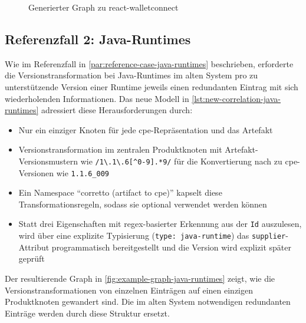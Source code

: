 \begin{figure}[htbp]
    \centering
    \makebox[\textwidth]{}
    \caption{Generierter Graph zu react-walletconnect}
    \label{fig:example-graph-walletconnect}
\end{figure}

\subsection{Referenzfall 2: Java-Runtimes}\label{subsec:example-java-runtimes}

Wie im Referenzfall in \autoref{par:reference-case-java-runtimes} beschrieben, erforderte die Versionstransformation bei Java-Runtimes im alten System pro zu unterstützende Version einer Runtime jeweils einen redundanten Eintrag mit sich wiederholenden Informationen.
Das neue Modell in \autoref{lst:new-correlation-java-runtimes} adressiert diese Herausforderungen durch:

\begin{itemize}
    \itemsep0em
    \item Nur ein einziger Knoten für jede \acrshort{cpe}-Repräsentation und das Artefakt
    \item Versionstransformation im zentralen Produktknoten mit Artefakt-Versionsmustern wie \verb|/1\.1\.6[^0-9].*9/| für die Konvertierung nach zu \acrshort{cpe}-Versionen wie \texttt{1.1.6\_009}
    \item Ein Namespace \enquote{corretto (artifact to cpe)} kapselt diese Transformationsregeln, sodass sie optional verwendet werden können
    \item Statt drei Eigenschaften mit regex-basierter Erkennung aus der \texttt{Id} auszulesen, wird über eine explizite Typisierung (\texttt{type: java-runtime}) das \texttt{supplier}-Attribut programmatisch bereitgestellt und die Version wird explizit später geprüft
\end{itemize}

Der resultierende Graph in \autoref{fig:example-graph-java-runtimes} zeigt, wie die Versionstransformationen von einzelnen Einträgen auf einen einzigen Produktknoten gewandert sind.
Die im alten System notwendigen redundanten Einträge werden durch diese Struktur ersetzt.

